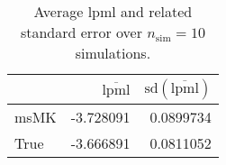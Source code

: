 \begin{table}[H]

\caption{Average lpml and related standard error over $n_{\text{sim}} = 10$ simulations.}
\centering
\begin{tabular}[t]{lrr}
\toprule
  & $\overbar{\text{lpml}}$ & $\text{sd}(\overbar{\text{lpml}})$\\
\midrule
msMK & -3.728091 & 0.0899734\\
True & -3.666891 & 0.0811052\\
\bottomrule
\end{tabular}
\end{table}